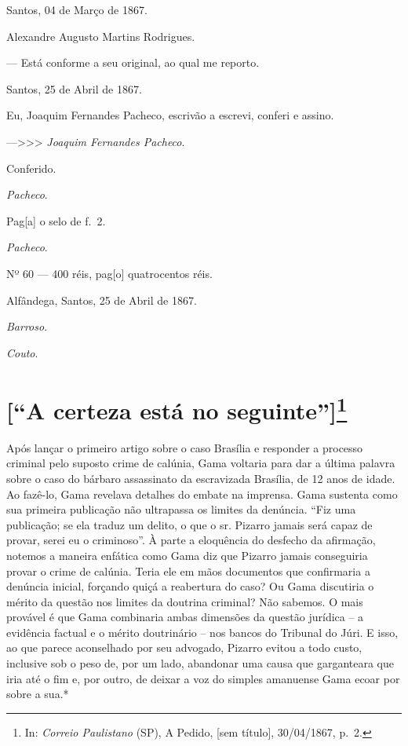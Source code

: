 Santos, 04 de Março de 1867.

Alexandre Augusto Martins Rodrigues.

--- Está conforme a seu original, ao qual me reporto.

Santos, 25 de Abril de 1867.

Eu, Joaquim Fernandes Pacheco, escrivão a escrevi, conferi e assino.

---\textgreater\textgreater\textgreater{} \emph{Joaquim Fernandes
Pacheco}.

Conferido.

\emph{Pacheco}.

Pag{[}a{]} o selo de f.~2.

\emph{Pacheco}.

Nº 60 --- 400 réis, pag{[}o{]} quatrocentos réis.

Alfândega, Santos, 25 de Abril de 1867.

\emph{Barroso}.

\emph{Couto}.

\chapter{{[}``A certeza está no seguinte''{]}\footnote{In: 
  \emph{Correio Paulistano} (SP), A Pedido,
  {[}sem título{]}, 30/04/1867, p.~2.}}

\begin{didascalia}
Após lançar o primeiro artigo sobre o caso Brasília e responder a
processo criminal pelo suposto crime de calúnia, Gama voltaria para dar
a última palavra sobre o caso do bárbaro assassinato da escravizada
Brasília, de 12 anos de idade. Ao fazê-lo, Gama revelava detalhes do
embate na imprensa. Gama sustenta como sua primeira publicação não
ultrapassa os limites da denúncia. ``Fiz uma publicação; se ela traduz um
delito, o que o sr. Pizarro jamais será capaz de provar, serei eu o
criminoso''. À parte a eloquência do desfecho da afirmação, notemos a
maneira enfática como Gama diz que Pizarro jamais conseguiria provar o
crime de calúnia. Teria ele em mãos documentos que confirmaria a
denúncia inicial, forçando quiçá a reabertura do caso? Ou Gama
discutiria o mérito da questão nos limites da doutrina criminal? Não
sabemos. O mais provável é que Gama combinaria ambas dimensões da
questão jurídica -- a evidência factual e o mérito doutrinário -- nos
bancos do Tribunal do Júri. E isso, ao que parece aconselhado por seu
advogado, Pizarro evitou a todo custo, inclusive sob o peso de, por um
lado, abandonar uma causa que garganteara que iria até o fim e, por
outro, de deixar a voz do simples amanuense Gama ecoar por sobre a sua.*
\end{didascalia}

